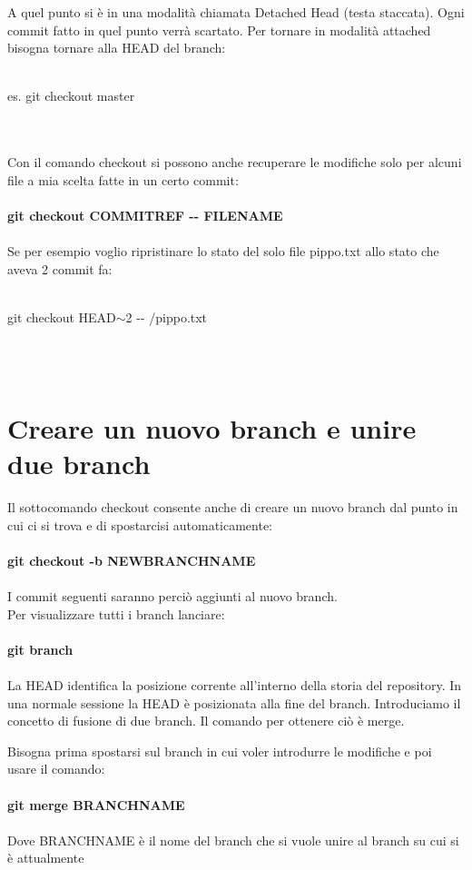 \documentclass[a4paper,12pt]{report}
\begin{document}
A quel punto si è in una modalità chiamata Detached Head (testa staccata). Ogni commit fatto in quel punto verrà scartato. Per tornare in modalità attached bisogna tornare alla HEAD del branch:
\\\\
\centerline{es. git checkout master}
\\\\
Con il comando checkout si possono anche recuperare le modifiche solo per alcuni file a mia scelta fatte in un certo commit:
\\\\
\textbf{git checkout COMMITREF -{}- FILENAME}
\\\\
Se per esempio voglio ripristinare lo stato del solo file pippo.txt allo stato che aveva 2 commit fa:
\\\\
\centerline{git checkout HEAD$\sim$2 -{}- /pippo.txt}
\\\\
\chapter{Creare un nuovo branch e unire due branch}
Il sottocomando checkout consente anche di creare un nuovo branch dal punto in cui ci si trova e di spostarcisi automaticamente:
\\\\
\textbf{git checkout -b NEWBRANCHNAME}
\\\\
I commit seguenti saranno perciò aggiunti al nuovo branch.
\\
Per visualizzare tutti i branch lanciare:
\\\\
\textbf{git branch}
\\\\
La HEAD identifica la posizione corrente all'interno della storia del repository. In una normale sessione la HEAD è posizionata alla fine del branch.
Introduciamo il concetto di fusione di due branch. Il comando per ottenere ciò è merge.

Bisogna prima spostarsi sul branch in cui voler introdurre le modifiche e poi usare il comando:
\\\\
\textbf{git merge BRANCHNAME}
\\\\
Dove BRANCHNAME è il nome del branch che si vuole unire al branch su cui si è attualmente
\end{document}
